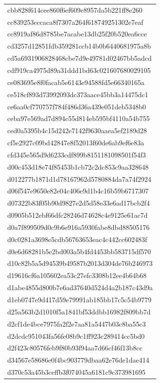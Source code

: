 \begin{tabular}{l}
cbb828f614cee860f6ef609e8957da5b221ff8e260 \\
cc839253eccaca8f7307a264f618749251302e7eaf \\
cc8919af86d8785be7acabe13db25f20b520ea6cce \\
cd3257d12851fdb359281ccb14b0b6440681975a8b \\
cd5a6931906828468cbe7d9e49781d02467bb5adcd \\
cdf919ca4975d89a31ddd1bd63c021607680029105 \\
ce083695e8f0facab5e6143e94588fd5e66340165a \\
ce518cf893d73992093dc373aace45bb3a14475dc1 \\
ce6aa0cf770757f784f486d36a439e051deb5348b0 \\
ceba97e569ad7d894c55d814eb595bf4110a54b755 \\
ced0a5395b4c15d242e7142f9630aaea5ef2189d28 \\
cf5e2927c09bd42847e8f52013f60de6ab9ef6e83a \\
cfd345e565d9d6233cdf899b8151181098501f54f3 \\
d00c453d18e74f85453b1cb72c2dc853c9aa328648 \\
d012277b1871d1d78167962d5780884da7a74f2924 \\
d06f547e9650e82e04c406e9d1b4c16b59b6717307 \\
d07322b83f05b90d9827e2d5d58e33e6ad17bcb2f4 \\
d0905b512ebf66dfc28246d74628c4e9125e61ac7d \\
d0a7f899509d0c9b6e916a5930fabe8dbd88505176 \\
d0c0281a3698e5cdb56763653eac4c442cc602483f \\
d0e6d68281b5e2bd003a5b4fd4453bb583715df570 \\
d10c82b5a5d94539b49587b2013d304de76b246973 \\
d19616cf6a105602ea53c27efc3308b12ee4b64b68 \\
d1abe4855d800b7e6ad37640d524d4a2b187c43d9a \\
d1eb0747e9d417d59e79991ab185bb17c5c54b9779 \\
d25a563b2d1010f5a1841bf53ddbb16982f809bb7d \\
d2cf1de4bce7975fa2f2e7aa81a5447b03c8ba55c3 \\
d2dcdc951043fa56fe08b9c1ff923c289414cc5bd0 \\
d2f423c80576feb9f80b93f94aa7d66cf46f13b8cc \\
d34567e58686e0f4bc903779dbaa62e76de1dae414 \\
d370c53a45b3ceffb3f074045a6181c9c373981695 \\

\end{tabular}
